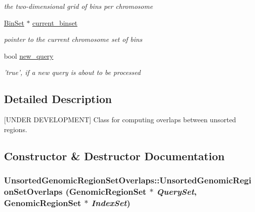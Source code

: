 \begin{CompactItemize}
\begin{CompactList}\small\item\em the two-dimensional grid of bins per chromosome \item\end{CompactList}\item 
\hypertarget{classUnsortedGenomicRegionSetOverlaps_6bbb87f3c66d04527f06a5761df1ab56}{
\hyperlink{classUnsortedGenomicRegionSetOverlaps_0f0857dd93ad3c047d1f5056a57edc14}{BinSet} $\ast$ \hyperlink{classUnsortedGenomicRegionSetOverlaps_6bbb87f3c66d04527f06a5761df1ab56}{current\_\-binset}}
\label{classUnsortedGenomicRegionSetOverlaps_6bbb87f3c66d04527f06a5761df1ab56}

\begin{CompactList}\small\item\em pointer to the current chromosome set of bins \item\end{CompactList}\item 
\hypertarget{classUnsortedGenomicRegionSetOverlaps_bafc544ce2c677ce071fa4e30ec2ecaf}{
bool \hyperlink{classUnsortedGenomicRegionSetOverlaps_bafc544ce2c677ce071fa4e30ec2ecaf}{new\_\-query}}
\label{classUnsortedGenomicRegionSetOverlaps_bafc544ce2c677ce071fa4e30ec2ecaf}

\begin{CompactList}\small\item\em 'true', if a new query is about to be processed \item\end{CompactList}\end{CompactItemize}


\subsection{Detailed Description}
\mbox{[}UNDER DEVELOPMENT\mbox{]} Class for computing overlaps between unsorted regions. 

\subsection{Constructor \& Destructor Documentation}
\hypertarget{classUnsortedGenomicRegionSetOverlaps_6a1255dfaac34080fae7880981b47acb}{
\subsubsection[UnsortedGenomicRegionSetOverlaps]{\setlength{\rightskip}{0pt plus 5cm}UnsortedGenomicRegionSetOverlaps::UnsortedGenomicRegionSetOverlaps ({\bf GenomicRegionSet} $\ast$ {\em QuerySet}, \/  {\bf GenomicRegionSet} $\ast$ {\em IndexSet})}}
\label{classUnsortedGenomicRegionSetOverlaps_6a1255dfaac34080fae7880981b47acb}


